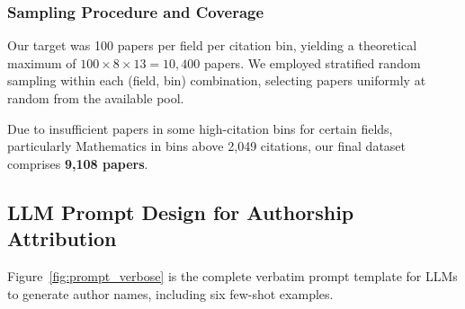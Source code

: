 \documentclass[11pt]{article}
\begin{document}
\subsubsection{Sampling Procedure and Coverage}

Our target was 100 papers per field per citation bin, yielding a theoretical maximum of $100 \times 8 \times 13 = 10,400$ papers. We employed stratified random sampling within each (field, bin) combination, selecting papers uniformly at random from the available pool.

Due to insufficient papers in some high-citation bins for certain fields, particularly Mathematics in bins above 2,049 citations, our final dataset comprises \textbf{9,108 papers}.

\subsection{LLM Prompt Design for Authorship Attribution}
\label{sec:appendix_prompt_design}

Figure~\ref{fig:prompt_verbose} is the complete verbatim prompt template for LLMs to generate author names, including six few-shot examples.
\end{document}
